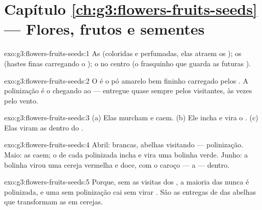 \section*{Capítulo \ref{ch:g3:flowers-fruits-seeds} --- Flores, frutos e sementes}

\begin{solution}{exo:g3:flowers-fruits-seeds:1}
As  (coloridas e perfumadas, elas atraem os ); os
 (hastes finas carregando o ); o  no centro (o
frasquinho que guarda as futuras ).
\end{solution}

\begin{solution}{exo:g3:flowers-fruits-seeds:2}
O  é o pó amarelo bem fininho carregado pelos . A
polinização é o  chegando ao  --- entregue quase sempre
pelos  visitantes, às vezes pelo vento.
\end{solution}

\begin{solution}{exo:g3:flowers-fruits-seeds:3}
(a) Elas murcham e caem. (b) Ele incha e vira o . (c) Elas
viram as  dentro do .
\end{solution}

\begin{solution}{exo:g3:flowers-fruits-seeds:4}
Abril:  brancas, abelhas visitando --- polinização. Maio: as
 caem; o  de cada  polinizada incha e vira uma
bolinha verde. Junho: a bolinha virou uma cereja vermelha e doce,
com o caroço --- a  --- dentro.
\end{solution}

\begin{solution}{exo:g3:flowers-fruits-seeds:5}
Porque, sem as visitas dos , a maioria das  nunca é
polinizada, e uma  sem polinização cai sem virar . São as
entregas de  das abelhas que transformam as  em cerejas.
\end{solution}

